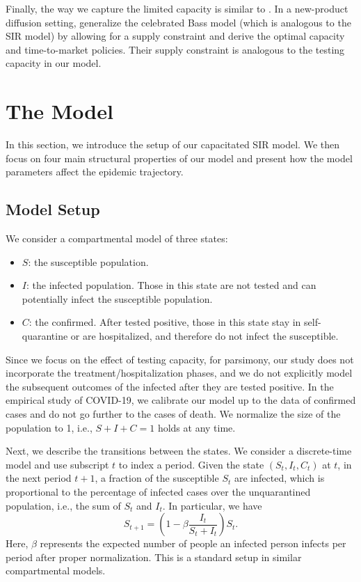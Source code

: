 \documentclass[nonblindrev, copyedit]{informs3a}
\newcounter{prop}[chapter]
\begin{document}
Finally, the way we capture the limited capacity is similar to \citet{ho2002managing}. In a new-product diffusion setting, \citet{ho2002managing} generalize the celebrated Bass model (which is analogous to the SIR model) by allowing for a supply constraint and derive the optimal capacity and time-to-market policies. Their supply constraint is analogous to the testing capacity in our model.




\section{The Model}
\label{The Model}
In this section, we introduce the setup of our capacitated SIR model. We then focus on four main structural properties of our model and present how the model parameters affect the epidemic trajectory.
\subsection{Model Setup}
\label{Model Setup}

We consider a compartmental model of three states:
\begin{itemize}
    \item $S$: the susceptible population.
    \item $I$: the infected population. Those in this state are not tested and can potentially infect the susceptible population.
    \item $C$: the confirmed. After tested positive, those in this state stay in self-quarantine or are hospitalized, and therefore do not infect the susceptible.
\end{itemize}
Since we focus on the effect of testing capacity, for parsimony, our study does not incorporate the treatment/hospitalization phases, and we do not explicitly model the subsequent outcomes of the infected after they are tested positive. In the empirical study of COVID-19, we calibrate our model up to the data of confirmed cases and do not go further to the cases of death.
We normalize the size of the population to 1, i.e., $S+I+C=1$ holds at any time.

Next, we describe the transitions between the states.
We consider a discrete-time model and use subscript $t$ to index a period.
Given the state $(S_t, I_t, C_t)$ at $t$, in the next period $t+1$, a fraction of the susceptible $S_t$ are infected, which is proportional to the percentage of infected cases over the unquarantined population, i.e., the sum of $S_t$ and $I_t$.
In particular, we have
\begin{equation}\label{eq:S_t recursive equation}
S_{t+1}=(1- \beta \frac{ I_{t}}{S_{t}+I_{t}})S_{t}.
\end{equation}
Here, $\beta$ represents the expected number of people an infected person infects per period after proper normalization.
This is a standard setup in similar compartmental models.
\end{document}
